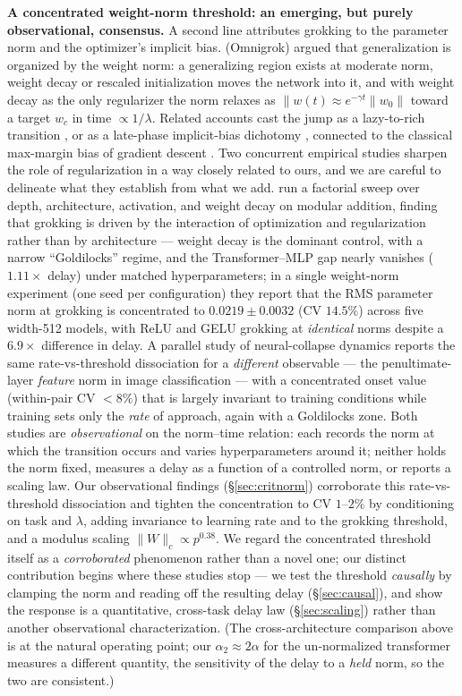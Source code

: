 \documentclass[10pt,twocolumn]{article}
\newcommand{\Wc}{\|W\|_{c}}
\begin{document}
\textbf{A concentrated weight-norm threshold: an emerging, but purely observational, consensus.}
A second line attributes grokking to the parameter norm and the optimizer's implicit bias.
\citet{liu2022omnigrok} (Omnigrok) argued that generalization is organized by the weight norm: a
generalizing region exists at moderate norm, weight decay or rescaled initialization moves the network into
it, and with weight decay as the only regularizer the norm relaxes as $\|w(t)\!\approx\!e^{-\gamma t}\|w_0\|$
toward a target $w_c$ in time $\propto 1/\lambda$. Related accounts cast the jump as a lazy-to-rich
transition \citep{kumar2023grokking}, or as a late-phase implicit-bias dichotomy \citep{lyu2023dichotomy},
connected to the classical max-margin bias of gradient descent \citep{soudry2018implicit}. Two concurrent
empirical studies sharpen the role of regularization in a way closely related to ours, and we are careful to
delineate what they establish from what we add. \citet{systematic2026grokking} run a factorial sweep over
depth, architecture, activation, and weight decay on modular addition, finding that grokking is driven by
the interaction of optimization and regularization rather than by architecture --- weight decay is the
dominant control, with a narrow ``Goldilocks'' regime, and the Transformer--MLP gap nearly vanishes
($1.11\times$ delay) under matched hyperparameters; in a single weight-norm experiment (one seed per
configuration) they report that the RMS parameter norm at grokking is concentrated to $0.0219\pm0.0032$
(CV $14.5\%$) across five width-512 models, with ReLU and GELU grokking at \emph{identical} norms despite a
$6.9\times$ difference in delay. A parallel study of neural-collapse dynamics
\citep{neuralcollapse2026} reports the same rate-vs-threshold dissociation for a \emph{different} observable
--- the penultimate-layer \emph{feature} norm in image classification --- with a concentrated onset value
(within-pair CV $<8\%$) that is largely invariant to training conditions while training sets only the
\emph{rate} of approach, again with a Goldilocks zone. Both studies are \emph{observational} on the
norm--time relation: each records the norm at which the transition occurs and varies hyperparameters around
it; neither holds the norm fixed, measures a delay as a function of a controlled norm, or reports a scaling
law. Our observational findings (\S\ref{sec:critnorm}) corroborate this
rate-vs-threshold dissociation and tighten the concentration to CV $1$--$2\%$ by conditioning on task and
$\lambda$, adding invariance to learning rate and to the grokking threshold, and a modulus scaling
$\Wc\!\propto\!p^{0.38}$. We regard the concentrated threshold itself as a \emph{corroborated} phenomenon
rather than a novel one; our distinct contribution begins where these studies stop --- we test the threshold
\emph{causally} by clamping the norm and reading off the resulting delay (\S\ref{sec:causal}), and show the
response is a quantitative, cross-task delay law (\S\ref{sec:scaling}) rather than another observational
characterization. (The cross-architecture comparison above is at the natural operating point; our
$\alpha_2\!\approx\!2\alpha$ for the un-normalized transformer measures a different quantity, the
sensitivity of the delay to a \emph{held} norm, so the two are consistent.)
\end{document}
